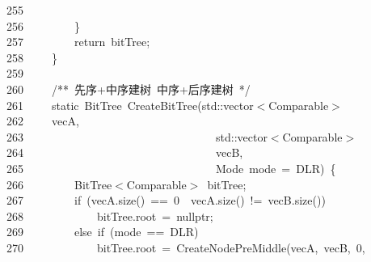 \documentclass[11pt,a4paper]{ctexart}
\newcommand{\hlstd}[1]{\textcolor[rgb]{0.2,0.2,0.2}{#1}}
\newcommand{\hlnum}[1]{\textcolor[rgb]{0.06,0.58,0.63}{#1}}
\newcommand{\hlcom}[1]{\textcolor[rgb]{0.59,0.59,0.59}{#1}}
\newcommand{\hlopt}[1]{\textcolor[rgb]{0.2,0.2,0.2}{#1}}
\newcommand{\hllin}[1]{\textcolor[rgb]{0.59,0.59,0.59}{#1}}
\newcommand{\hlkwa}[1]{\textcolor[rgb]{0.23,0.42,0.78}{#1}}
\newcommand{\hlkwb}[1]{\textcolor[rgb]{0.63,0,0.31}{#1}}
\newcommand{\hlkwc}[1]{\textcolor[rgb]{0,0.63,0.31}{#1}}
\newcommand{\hlkwd}[1]{\textcolor[rgb]{0.78,0.23,0.41}{#1}}
\begin{document}
\hllin{255\ }\hlstd{}\\
\hllin{256\ }\hlstd{}\hlstd{\ \ \ \ \ \ \ \ }\hlstd{}\hlopt{\}}\\
\hllin{257\ }\hlstd{}\hlstd{\ \ \ \ \ \ \ \ }\hlstd{}\hlkwa{return\ }\hlstd{bitTree}\hlopt{;}\\
\hllin{258\ }\hlstd{}\hlstd{\ \ \ \ }\hlstd{}\hlopt{\}}\\
\hllin{259\ }\hlstd{}\\
\hllin{260\ }\hlstd{}\hlstd{\ \ \ \ }\hlstd{}\hlcom{/{*}{*}\ 先序+中序建树\ 中序+后序建树\ {*}/}\hlstd{}\\
\hllin{261\ }\hlstd{}\hlstd{\ \ \ \ }\hlstd{}\hlkwb{static\ }\hlstd{BitTree\ }\hlkwd{CreateBitTree}\hlstd{}\hlopt{(}\hlstd{}\hlkwc{std}\hlstd{}\hlopt{::}\hlstd{vector}\hlopt{$<$}\hlstd{Comparable}\hlopt{$>$\ }\Righttorque\\
\hllin{262\ }\hlstd{}\hlstd{\ \ \ \ }\hlstd{vecA}\hlopt{,}\\
\hllin{263\ }\hlstd{}\hlstd{\ \ \ \ \ \ \ \ \ \ \ \ \ \ \ \ \ \ \ \ \ \ \ \ \ \ \ \ \ \ \ \ \ }\hlstd{}\hlkwc{std}\hlstd{}\hlopt{::}\hlstd{vector}\hlopt{$<$}\hlstd{Comparable}\hlopt{$>$\ }\Righttorque\\
\hllin{264\ }\hlstd{}\hlstd{\ \ \ \ \ \ \ \ \ \ \ \ \ \ \ \ \ \ \ \ \ \ \ \ \ \ \ \ \ \ \ \ \ }\hlstd{vecB}\hlopt{,}\\
\hllin{265\ }\hlstd{}\hlstd{\ \ \ \ \ \ \ \ \ \ \ \ \ \ \ \ \ \ \ \ \ \ \ \ \ \ \ \ \ \ \ \ \ }\hlstd{Mode\ mode\ }\hlopt{=\ }\hlstd{DLR}\hlopt{)\ \{}\\
\hllin{266\ }\hlstd{}\hlstd{\ \ \ \ \ \ \ \ }\hlstd{BitTree}\hlopt{$<$}\hlstd{Comparable}\hlopt{$>$\ }\hlstd{bitTree}\hlopt{;}\\
\hllin{267\ }\hlstd{}\hlstd{\ \ \ \ \ \ \ \ }\hlstd{}\hlkwa{if\ }\hlstd{}\hlopt{(}\hlstd{vecA}\hlopt{.}\hlstd{}\hlkwd{size}\hlstd{}\hlopt{()\ ==\ }\hlstd{}\hlnum{0\ }\hlstd{}\hlopt{\textbar \textbar \ }\hlstd{vecA}\hlopt{.}\hlstd{}\hlkwd{size}\hlstd{}\hlopt{()\ !=\ }\hlstd{vecB}\hlopt{.}\hlstd{}\hlkwd{size}\hlstd{}\hlopt{())}\\
\hllin{268\ }\hlstd{}\hlstd{\ \ \ \ \ \ \ \ \ \ \ \ }\hlstd{bitTree}\hlopt{.}\hlstd{root\ }\hlopt{=\ }\hlstd{}\hlkwc{nullptr}\hlstd{}\hlopt{;}\\
\hllin{269\ }\hlstd{}\hlstd{\ \ \ \ \ \ \ \ }\hlstd{}\hlkwa{else\ if\ }\hlstd{}\hlopt{(}\hlstd{mode\ }\hlopt{==\ }\hlstd{DLR}\hlopt{)}\\
\hllin{270\ }\hlstd{}\hlstd{\ \ \ \ \ \ \ \ \ \ \ \ }\hlstd{bitTree}\hlopt{.}\hlstd{root\ }\hlopt{=\ }\hlstd{}\hlkwd{CreateNodePreMiddle}\hlstd{}\hlopt{(}\hlstd{vecA}\hlopt{,\ }\hlstd{vecB}\hlopt{,\ }\hlstd{}\hlnum{0}\hlstd{}\hlopt{,}\Righttorque\\
\end{document}
